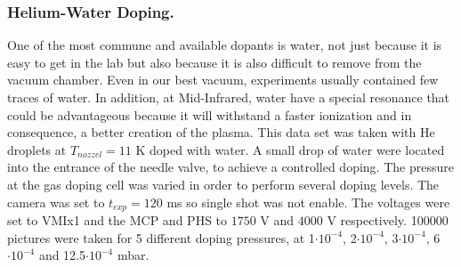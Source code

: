\subsubsection{Helium-Water Doping.}

One of the most commune and available dopants is water, not just because it is easy to get in the lab but also because it is also difficult to remove from the vacuum chamber. Even in our best vacuum, experiments usually contained few traces of water. In addition, at Mid-Infrared, water have a special resonance that could be advantageous because it will withstand a faster ionization and in consequence, a better creation of the plasma. This data set was taken with He droplets at $T_{nozzel}=11$ K doped with water. A small drop of water were located into the entrance of the needle valve, to achieve a controlled doping. The pressure at the gas doping cell was varied in order to perform several doping levels. The camera was set to $t_{exp}=120$ ms so single shot was not enable. The voltages were set to VMIx1 and the MCP and PHS to $1750$ V and $4000$ V respectively. 100000 pictures were taken for 5 different doping pressures, at 1$\cdot10^{-4}$, 2$\cdot10^{-4}$, 3$\cdot10^{-4}$, 6$\cdot10^{-4}$ and 12.5$\cdot10^{-4}$ mbar. 

